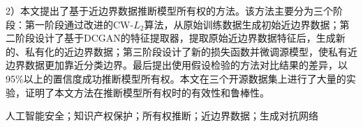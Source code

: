 \begin{zhaiyao}
2）本文提出了基于近边界数据推断模型所有权的方法。该方法主要分为三个阶段：第一阶段通过改进的CW-$L_2$算法，从原始训练数据生成初始近边界数据；第二阶段设计了基于DCGAN的特征提取器，提取原始近边界数据特征后，生成新的、私有化的近边界数据；第三阶段设计了新的损失函数并微调源模型，使私有近边界数据更加靠近分类边界。最后提出使用假设检验的方法对比结果的差异，以95\%以上的置信度成功推断模型所有权。本文在三个开源数据集上进行了大量的实验，证明了本文方法在推断模型所有权时的有效性和鲁棒性。

%

\end{zhaiyao}


\begin{guanjianci}
人工智能安全；知识产权保护；所有权推断；近边界数据；生成对抗网络
\end{guanjianci}



